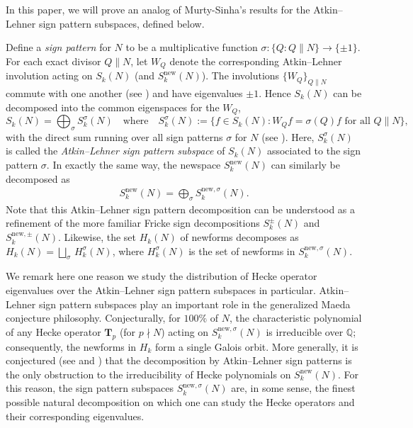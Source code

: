 \documentclass[11pt,letterpaper,reqno]{amsart}
\theoremstyle{definition}
\numberwithin{equation}{section}
\numberwithin{figure}{section}
\numberwithin{table}{section}
\newcommand{\nw}{\mathrm{new}}
\begin{document}
In this paper, we will prove an analog of Murty-Sinha's results for the Atkin--Lehner sign pattern subspaces, defined below.


Define a \textit{sign pattern} for $N$ to be a multiplicative function $\sigma:\{Q:Q\parallel N\}\to\{\pm1\}$.
For each exact divisor $Q \| N$, let $W_{Q}$ denote the corresponding Atkin--Lehner involution acting on $S_k(N)$ (and $S_k^\nw(N)$). The involutions $\{W_{Q}\}_{Q \| N}$ commute with one another (see \cite[$\S$13.2.2]{cohen2017modular}) and have eigenvalues $\pm 1$.
Hence $S_k(N)$ can be decomposed into the common eigenspaces for the $W_Q$,
\[
S_k(N)=\bigoplus_\sigma S_k^\sigma(N) 
\quad \text{where} \quad
S_k^\sigma(N)
:=
\{f\in S_k(N): W_{Q}f=\sigma(Q)f
\text{ for all } Q\parallel N\},
\]
with the direct sum running over all sign patterns $\sigma$ for $N$ (see \cite[$\S$13.4]{cohen2017modular}). Here, $S_k^\sigma(N)$ is called the \textit{Atkin--Lehner sign pattern subspace} of $S_k(N)$ associated to the sign pattern $\sigma$.
In exactly the same way, the newspace $S_k^{\nw}(N)$ can similarly be decomposed as
\begin{align}
    S_k^\nw(N)=\bigoplus_\sigma S_k^{\nw,\sigma}(N).
\end{align}
Note that this Atkin--Lehner sign pattern decomposition can be understood as a refinement of the more familiar Fricke sign decompositions $S_k^\pm(N)$ and $S_k^{\nw,\pm}(N)$. Likewise, the set $H_k(N)$ of newforms decomposes as $H_k(N)=\bigsqcup_{\sigma} \, H_k^{\sigma}(N)$, where $H_k^{\sigma}(N)$ is the set of newforms in $S_k^{\nw,\sigma}(N)$.






We remark here one reason we study the distribution of Hecke operator eigenvalues over the Atkin--Lehner sign pattern subspaces in particular.
Atkin--Lehner sign pattern subspaces play an important role in the generalized Maeda conjecture philosophy. Conjecturally, for $100 \%$ of $N$, the characteristic polynomial of any Hecke operator $\mathbf{T}_p$ (for $p\nmid N$) acting on $S_k^{\mathrm{new},\sigma}(N)$ is irreducible over $\mathbb Q$; consequently, the newforms in $H_k$ form a single Galois orbit. More generally, it is conjectured (see \cite{Chow2015} and \cite{Kimball2021}) that the decomposition by Atkin--Lehner sign patterns is the only obstruction to the irreducibility of Hecke polynomials on $S_k^{\mathrm{new}}(N)$. For this reason, the sign pattern subspaces $S_k^{\nw,\sigma}(N)$ are, in some sense, the finest possible natural decomposition on which one can study the Hecke operators and their corresponding eigenvalues.
\end{document}
